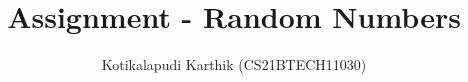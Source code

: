\documentclass[journal,12pt,twocolumn]{IEEEtran}
\renewcommand\thesection{\arabic{section}}
\begin{document}
\makeatletter
{}
\makeatother
\let\StandardTheFigure\thefigure
\renewcommand{\thefigure}{\thesection}
\makeatletter
{}
\makeatother
\let\StandardTheFigure\thefigure
\let\StandardTheTable\thetable
\let\vec\mathbf
{}
\vspace{3cm}
\title{
	{
	Assignment - Random Numbers
	}
}

\author{Kotikalapudi Karthik (CS21BTECH11030)}
\maketitle
\tableofcontents
\bigskip
\renewcommand{\thefigure}{\theenumi}
\renewcommand{\thetable}{\theenumi}
\end{document}
